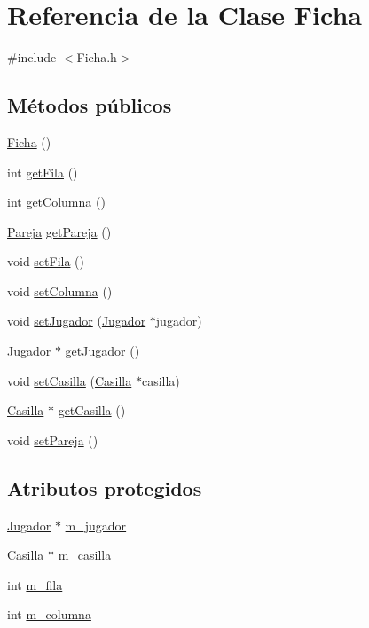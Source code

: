 \hypertarget{class_ficha}{\section{Referencia de la Clase Ficha}
\label{class_ficha}
}


{\ttfamily \#include $<$Ficha.\-h$>$}

\subsection*{Métodos públicos}
\begin{DoxyCompactItemize}
\item 
\hyperlink{class_ficha_ad57dd3e499ebb36f1a3b3e978391cd80}{Ficha} ()
\item 
int \hyperlink{class_ficha_a5d8bfecef738f859159a6af7484bd525}{get\-Fila} ()
\item 
int \hyperlink{class_ficha_a069d3b190fd63b9ab765287d813696bb}{get\-Columna} ()
\item 
\hyperlink{class_pareja}{Pareja} \hyperlink{class_ficha_a6630690eb9d2d842d0bc1c1437c976be}{get\-Pareja} ()
\item 
void \hyperlink{class_ficha_a58ea0ccbc31ac6782d398efc4a4d3ffd}{set\-Fila} ()
\item 
void \hyperlink{class_ficha_a80d1429ccb2e9d765c692df128dc9a1b}{set\-Columna} ()
\item 
void \hyperlink{class_ficha_a8b701233ee7bfce83a296499486bb2da}{set\-Jugador} (\hyperlink{class_jugador}{Jugador} $\ast$jugador)
\item 
\hyperlink{class_jugador}{Jugador} $\ast$ \hyperlink{class_ficha_ad34d1e99130e953b976935a23f343d7a}{get\-Jugador} ()
\item 
void \hyperlink{class_ficha_a570c6284bfde76f4b37ea7e787cb5a11}{set\-Casilla} (\hyperlink{class_casilla}{Casilla} $\ast$casilla)
\item 
\hyperlink{class_casilla}{Casilla} $\ast$ \hyperlink{class_ficha_ad1e6ecb0d351c0c6916ccd6efdba9941}{get\-Casilla} ()
\item 
void \hyperlink{class_ficha_adf7b11e180220a0eb851f4d4fc25655b}{set\-Pareja} ()
\end{DoxyCompactItemize}
\subsection*{Atributos protegidos}
\begin{DoxyCompactItemize}
\item 
\hyperlink{class_jugador}{Jugador} $\ast$ \hyperlink{class_ficha_aa9f5803362eb2d1b73fa70e8cc6a9f76}{m\-\_\-jugador}
\item 
\hyperlink{class_casilla}{Casilla} $\ast$ \hyperlink{class_ficha_a71e8b3850267a2cd0c8a4b9562d8619c}{m\-\_\-casilla}
\item 
int \hyperlink{class_ficha_a57e423ed2ba729e78961a89cbef4fdf9}{m\-\_\-fila}
\item 
int \hyperlink{class_ficha_adc422685513ddfaefd4165af3cee652a}{m\-\_\-columna}
\end{DoxyCompactItemize}


